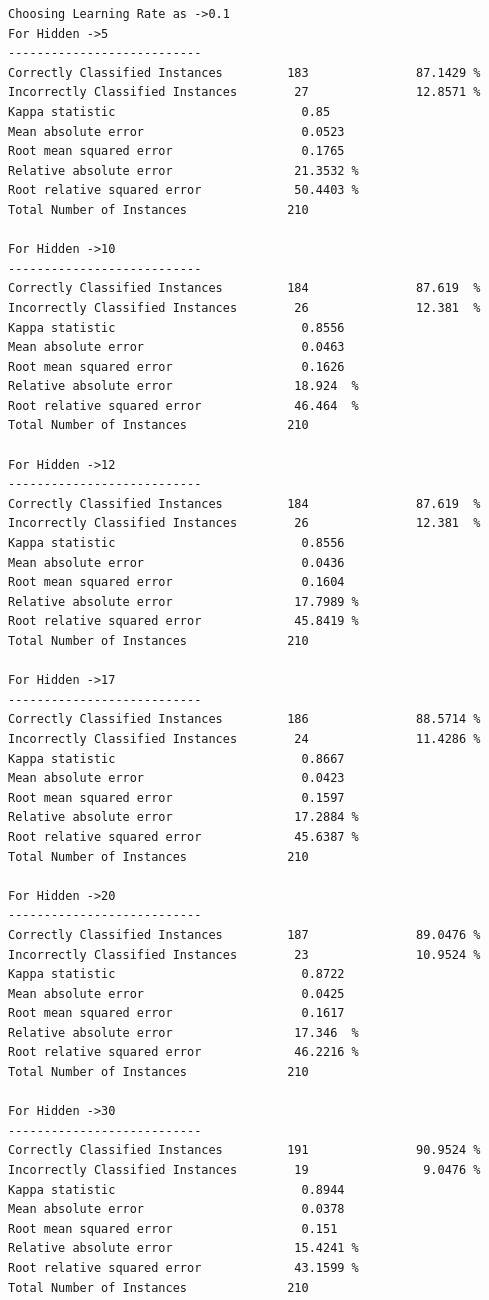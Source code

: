 \documentclass[fontsize=10pt,DIV=14]{scrartcl}
\begin{document}
\begin{itemize}
\begin{verbatim}
Choosing Learning Rate as ->0.1
For Hidden ->5 
---------------------------
Correctly Classified Instances         183               87.1429 %
Incorrectly Classified Instances        27               12.8571 %
Kappa statistic                          0.85  
Mean absolute error                      0.0523
Root mean squared error                  0.1765
Relative absolute error                 21.3532 %
Root relative squared error             50.4403 %
Total Number of Instances              210     

For Hidden ->10 
---------------------------
Correctly Classified Instances         184               87.619  %
Incorrectly Classified Instances        26               12.381  %
Kappa statistic                          0.8556
Mean absolute error                      0.0463
Root mean squared error                  0.1626
Relative absolute error                 18.924  %
Root relative squared error             46.464  %
Total Number of Instances              210     

For Hidden ->12 
---------------------------
Correctly Classified Instances         184               87.619  %
Incorrectly Classified Instances        26               12.381  %
Kappa statistic                          0.8556
Mean absolute error                      0.0436
Root mean squared error                  0.1604
Relative absolute error                 17.7989 %
Root relative squared error             45.8419 %
Total Number of Instances              210     

For Hidden ->17 
---------------------------
Correctly Classified Instances         186               88.5714 %
Incorrectly Classified Instances        24               11.4286 %
Kappa statistic                          0.8667
Mean absolute error                      0.0423
Root mean squared error                  0.1597
Relative absolute error                 17.2884 %
Root relative squared error             45.6387 %
Total Number of Instances              210     

For Hidden ->20 
---------------------------
Correctly Classified Instances         187               89.0476 %
Incorrectly Classified Instances        23               10.9524 %
Kappa statistic                          0.8722
Mean absolute error                      0.0425
Root mean squared error                  0.1617
Relative absolute error                 17.346  %
Root relative squared error             46.2216 %
Total Number of Instances              210     

For Hidden ->30 
---------------------------
Correctly Classified Instances         191               90.9524 %
Incorrectly Classified Instances        19                9.0476 %
Kappa statistic                          0.8944
Mean absolute error                      0.0378
Root mean squared error                  0.151 
Relative absolute error                 15.4241 %
Root relative squared error             43.1599 %
Total Number of Instances              210     


\end{verbatim}
\end{itemize}
\end{document}
